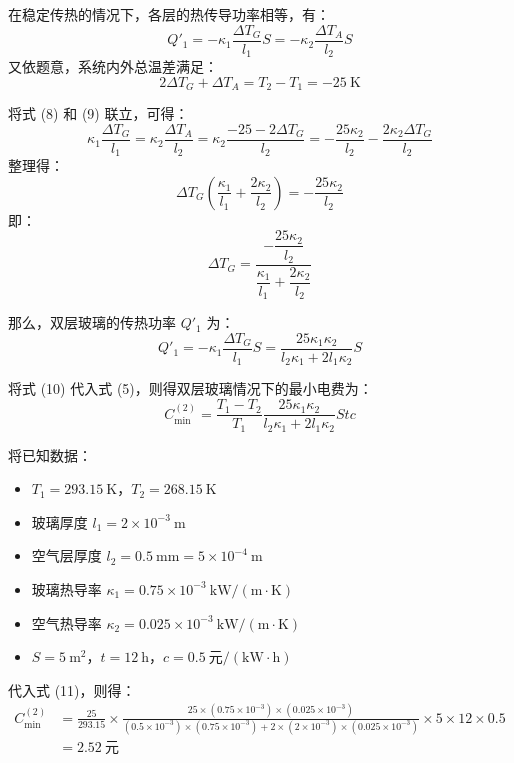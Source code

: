 \documentclass[UTF8]{ctexart}
\begin{document}
在稳定传热的情况下，各层的热传导功率相等，有：
\begin{equation}
Q'_1 = -\kappa_1 \frac{\Delta T_G}{l_1} S = -\kappa_2 \frac{\Delta T_A}{l_2} S \tag{8}
\end{equation}
又依题意，系统内外总温差满足：
\begin{equation}
2\Delta T_G + \Delta T_A = T_2 - T_1 = -25\ \mathrm{K} \tag{9}
\end{equation}

将式 (8) 和 (9) 联立，可得：
\begin{equation*}
\kappa_1 \frac{\Delta T_G}{l_1} = \kappa_2 \frac{\Delta T_A}{l_2} = \kappa_2 \frac{-25 - 2\Delta T_G}{l_2} = -\frac{25\kappa_2}{l_2} - \frac{2\kappa_2\Delta T_G}{l_2}
\end{equation*}
整理得：
\begin{equation*}
\Delta T_G \left( \frac{\kappa_1}{l_1} + \frac{2\kappa_2}{l_2} \right) = -\frac{25\kappa_2}{l_2}
\end{equation*}
即：
\begin{equation*}
\Delta T_G = \frac{-\dfrac{25\kappa_2}{l_2}}{\dfrac{\kappa_1}{l_1} + \dfrac{2\kappa_2}{l_2}}
\end{equation*}

那么，双层玻璃的传热功率 $Q'_1$ 为：
\begin{equation}
Q'_1 = -\kappa_1 \frac{\Delta T_G}{l_1} S = \frac{25\kappa_1\kappa_2}{l_2\kappa_1 + 2l_1\kappa_2} S \tag{10}
\end{equation}

将式 (10) 代入式 (5)，则得双层玻璃情况下的最小电费为：
\begin{equation}
C_{\min}^{(2)} = \frac{T_1 - T_2}{T_1} \frac{25\kappa_1\kappa_2}{l_2\kappa_1 + 2l_1\kappa_2} S t c \tag{11}
\end{equation}

将已知数据：
\begin{itemize}
    \item $T_1 = 293.15\ \mathrm{K}$，$T_2 = 268.15\ \mathrm{K}$
    \item 玻璃厚度 $l_1 = 2 \times 10^{-3}\ \mathrm{m}$
    \item 空气层厚度 $l_2 = 0.5\ \mathrm{mm} = 5 \times 10^{-4}\ \mathrm{m}$
    \item 玻璃热导率 $\kappa_1 = 0.75 \times 10^{-3}\ \mathrm{kW/(m\cdot K)}$
    \item 空气热导率 $\kappa_2 = 0.025 \times 10^{-3}\ \mathrm{kW/(m\cdot K)}$
    \item $S = 5\ \mathrm{m}^2$，$t = 12\ \mathrm{h}$，$c = 0.5\ \text{元}/(\mathrm{kW\cdot h})$
\end{itemize}
代入式 (11)，则得：
\begin{align*}
C_{\min}^{(2)} &= \frac{25}{293.15} \times \frac{25 \times (0.75 \times 10^{-3}) \times (0.025 \times 10^{-3})}{(0.5 \times 10^{-3}) \times (0.75 \times 10^{-3}) + 2 \times (2 \times 10^{-3}) \times (0.025 \times 10^{-3})} \times 5 \times 12 \times 0.5 \\
&= 2.52\ \text{元}
\end{align*}
\end{document}

